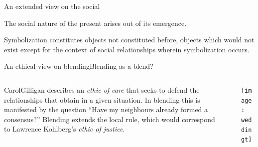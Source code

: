 \begin{frame}{An extended view on the social}{}
{\small The social nature of the present arises out of its emergence.

\medskip



Symbolization constitutes objects not constituted before, objects which would not exist except for the context of social relationships wherein symbolization occurs.
} \qquad\qquad {}
\end{frame}

\begin{frame}{An ethical view on blending}{Blending as a blend?}
\begin{columns}[onlytextwidth]
\begin{column}[T]{3in}
{Carol\bsp Gilligan} describes an
\emph{ethic of care} that seeks to defend the
relationships that obtain in a given situation.  In blending this is
manifested by the question ``Have my neighbours already formed a
consensus?''  Blending extends the local rule, which would correspond
to Lawrence Kohlberg's \emph{ethic of justice}.
\end{column}
\begin{column}[T]{.1in}
\end{column}
\begin{column}[T]{2in}
\vspace*{.2in}
\texttt{[image: weddingt]}
\end{column}
\end{columns}
\end{frame}

